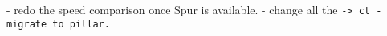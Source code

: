 
- redo the speed comparison once Spur is available.
- change all the \tt -> ct 
- migrate to pillar.